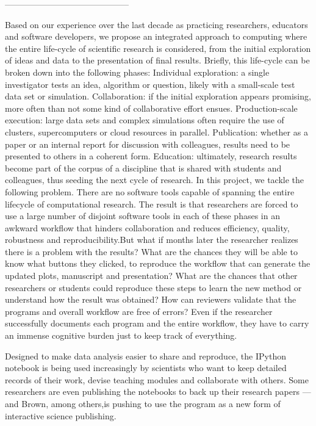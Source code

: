 --------------------------------------------

Based on our experience over the last decade as practicing researchers, educators and software developers, we propose an integrated approach to computing where the entire life-cycle of scientific research is considered, from the initial exploration of ideas and data to the presentation of final results. Briefly, this life-cycle can be broken down into the following phases:
 Individual exploration: a single investigator tests an idea, algorithm or question, likely with a small-scale test data set or simulation.
 Collaboration: if the initial exploration appears promising, more often than not some kind of collaborative effort ensues.
 Production-scale execution: large data sets and complex simulations often require the use of clusters, supercomputers or cloud resources in parallel.
 Publication: whether as a paper or an internal report for discussion with colleagues, results need to be presented to others in a coherent form.
 Education: ultimately, research results become part of the corpus of a discipline that is shared with students and colleagues, thus seeding the next cycle of research.
In this project, we tackle the following problem. There are no software tools capable of spanning the entire lifecycle of computational research. The result is that researchers are forced to use a large number of disjoint software tools in each of these phases in an awkward workflow that hinders collaboration and reduces efficiency, quality, robustness and reproducibility.But what if months later the researcher realizes there is a problem with the results? What are the chances they will be able to know what buttons they clicked, to reproduce the workflow that can generate the updated plots, manuscript and presentation? What are the chances that other researchers or students could reproduce these steps to learn the new method or understand how the result was obtained? How can reviewers validate that the programs and overall workflow are free of errors? Even if the researcher successfully documents each program and the entire workflow, they have to carry an immense cognitive burden just to keep track of everything.



Designed to make data analysis easier to share and reproduce, the IPython notebook is being used increasingly by scientists who want to keep detailed records of their work, devise teaching modules and collaborate with others. Some researchers are even publishing the notebooks to back up their research papers — and Brown, among others,is pushing to use the program as a new form of interactive science publishing. \cite{shen2014interactive}

